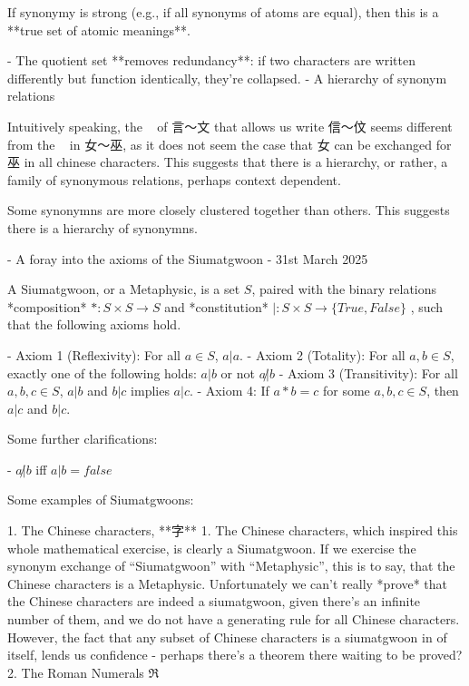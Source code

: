     If synonymy is strong (e.g., if all synonyms of atoms are equal), then this is a **true set of atomic meanings**.
    
    - The quotient set **removes redundancy**: if two characters are written differently but function identically, they’re collapsed.
- A hierarchy of synonym relations
    
    Intuitively speaking, the ~ of 言～文 that allows us write 信～伩 seems different from the ~ in 女～巫, as it does not seem the case that 女 can be exchanged for 巫 in all chinese characters. This suggests that there is a hierarchy, or rather, a family of synonymous relations, perhaps context dependent. 
    
    Some synonymns are more closely clustered together than others. This suggests there is a hierarchy of synonymns.
    
- A foray into the axioms of the Siumatgwoon - 31st March 2025
    
    A Siumatgwoon, or a Metaphysic, is a set $S$, paired with the binary relations *composition* $* : S \times S \rightarrow S$ and *constitution* $|:S\times S \rightarrow \{True, False\}$ , such that the following axioms hold. 
    
    - Axiom 1 (Reflexivity): For all $a \in S$, $a|a$.
    - Axiom 2 (Totality): For all $a,b\in S$, exactly one of the following holds: $a|b$ or not $a\not|b$
    - Axiom 3 (Transitivity): For all $a,b,c\in S$, $a|b$ and $b|c$ implies $a|c$.
    - Axiom 4: If $a*b=c$ for some $a,b,c\in S$, then
    $a|c$ and $b|c$.
    
    Some further clarifications: 
    
    - $a\not|b$ iff $a|b = false$
    
    Some examples of Siumatgwoons: 
    
    1. The Chinese characters, **字**
        1. The Chinese characters, which inspired this whole mathematical exercise, is clearly a Siumatgwoon. If we exercise the synonym exchange of “Siumatgwoon” with “Metaphysic”, this is to say, that the Chinese characters is a Metaphysic. Unfortunately we can’t really *prove* that the Chinese characters are indeed a siumatgwoon, given there’s an infinite number of them, and we do not have a generating rule for all Chinese characters. However, the fact that any subset of Chinese characters is a siumatgwoon in of itself, lends us confidence - perhaps there’s a theorem there waiting to be proved?
    2. The Roman Numerals $\mathfrak{R}$
        
